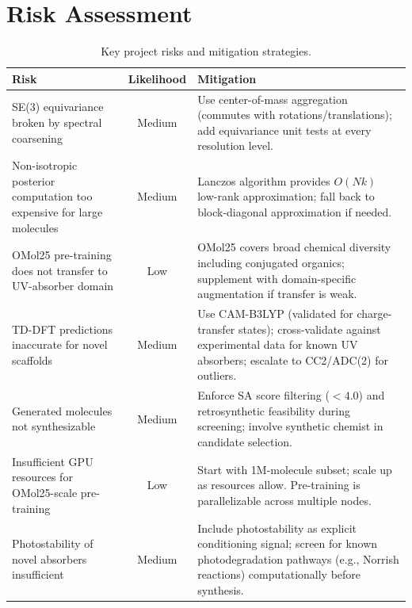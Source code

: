 \documentclass[11pt,a4paper]{article}
\begin{document}
\section{Risk Assessment}

\begin{table}[h!]
\centering
\small
\renewcommand{\arraystretch}{1.3}
\begin{tabular}{>{\raggedright}p{3.8cm} c >{\raggedright\arraybackslash}p{6.5cm}}
  \toprule
  \textbf{Risk} & \textbf{Likelihood} & \textbf{Mitigation} \\
  \midrule
  SE(3) equivariance broken by spectral coarsening &
  Medium &
  Use center-of-mass aggregation (commutes with rotations/translations);
  add equivariance unit tests at every resolution level. \\

  Non-isotropic posterior computation too expensive for large molecules &
  Medium &
  Lanczos algorithm provides $O(Nk)$ low-rank approximation; fall back to
  block-diagonal approximation if needed. \\

  OMol25 pre-training does not transfer to UV-absorber domain &
  Low &
  OMol25 covers broad chemical diversity including conjugated organics;
  supplement with domain-specific augmentation if transfer is weak. \\

  TD-DFT predictions inaccurate for novel scaffolds &
  Medium &
  Use CAM-B3LYP (validated for charge-transfer states); cross-validate
  against experimental data for known UV absorbers; escalate to
  CC2/ADC(2) for outliers. \\

  Generated molecules not synthesizable &
  Medium &
  Enforce SA score filtering ($< 4.0$) and retrosynthetic feasibility
  during screening; involve synthetic chemist in candidate selection. \\

  Insufficient GPU resources for OMol25-scale pre-training &
  Low &
  Start with 1M-molecule subset; scale up as resources allow.
  Pre-training is parallelizable across multiple nodes. \\

  Photostability of novel absorbers insufficient &
  Medium &
  Include photostability as explicit conditioning signal; screen for
  known photodegradation pathways (e.g., Norrish reactions) computationally
  before synthesis. \\
  \bottomrule
\end{tabular}
\caption{Key project risks and mitigation strategies.}
\label{tab:risks}
\end{table}
\end{document}

